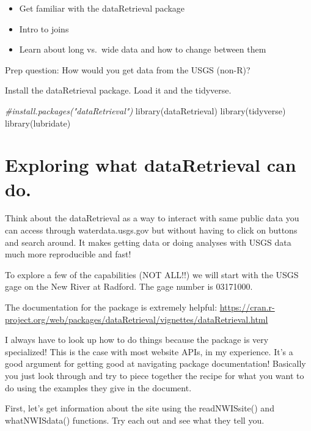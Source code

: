 \documentclass[
]{book}
\newenvironment{Shaded}{\begin{snugshade}}{\end{snugshade}}
\newcommand{\CommentTok}[1]{\textcolor[rgb]{0.56,0.35,0.01}{\textit{#1}}}
\newcommand{\FunctionTok}[1]{\textcolor[rgb]{0.00,0.00,0.00}{#1}}
\newcommand{\NormalTok}[1]{#1}
\providecommand{\tightlist}{%
  \setlength{\itemsep}{0pt}\setlength{\parskip}{0pt}}
\begin{document}
\begin{itemize}
\tightlist
\item
  Get familiar with the dataRetrieval package
\item
  Intro to joins
\item
  Learn about long vs.~wide data and how to change between them
\end{itemize}

Prep question: How would you get data from the USGS (non-R)?

Install the dataRetrieval package. Load it and the tidyverse.

\begin{Shaded}
\begin{Highlighting}[]
\CommentTok{\#install.packages("dataRetrieval")}
\FunctionTok{library}\NormalTok{(dataRetrieval)}
\FunctionTok{library}\NormalTok{(tidyverse)}
\FunctionTok{library}\NormalTok{(lubridate)}
\end{Highlighting}
\end{Shaded}

\hypertarget{exploring-what-dataretrieval-can-do.}{%
\section{Exploring what dataRetrieval can do.}\label{exploring-what-dataretrieval-can-do.}}

Think about the dataRetrieval as a way to interact with same public data you can access through waterdata.usgs.gov but without having to click on buttons and search around. It makes getting data or doing analyses with USGS data much more reproducible and fast!

To explore a few of the capabilities (NOT ALL!!) we will start with the USGS gage on the New River at Radford. The gage number is 03171000.

The documentation for the package is extremely helpful: \url{https://cran.r-project.org/web/packages/dataRetrieval/vignettes/dataRetrieval.html}

I always have to look up how to do things because the package is very specialized! This is the case with most website APIs, in my experience. It's a good argument for getting good at navigating package documentation! Basically you just look through and try to piece together the recipe for what you want to do using the examples they give in the document.

First, let's get information about the site using the readNWISsite() and whatNWISdata() functions. Try each out and see what they tell you.
\end{document}
